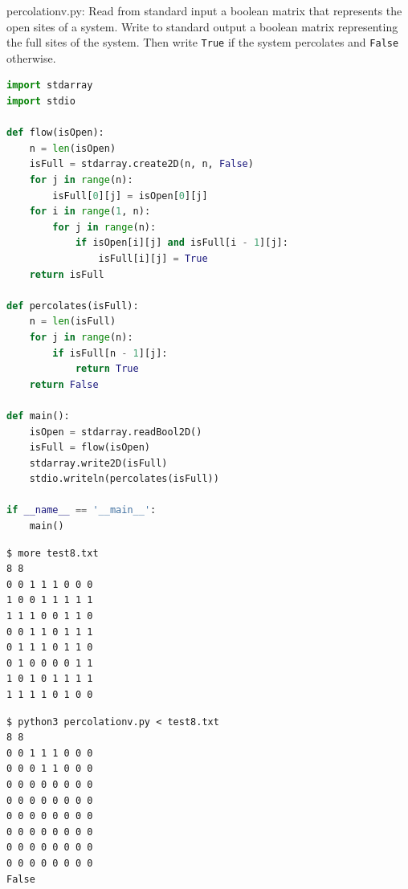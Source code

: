 \documentclass[8pt,a4paper,compress]{beamer}
\begin{document}
\begin{frame}[fragile]
\pause

\begin{framed}
\tiny percolationv.py: Read from standard input a boolean matrix that represents the open sites of a system. Write to standard output a boolean matrix representing the full sites of the system. Then write \lstinline{True} if the system percolates and \lstinline{False} otherwise.
\end{framed}

\begin{lstlisting}[language=Python]
import stdarray
import stdio

def flow(isOpen):
    n = len(isOpen)
    isFull = stdarray.create2D(n, n, False)
    for j in range(n):
        isFull[0][j] = isOpen[0][j]
    for i in range(1, n):
        for j in range(n):
            if isOpen[i][j] and isFull[i - 1][j]:
                isFull[i][j] = True
    return isFull

def percolates(isFull):
    n = len(isFull)
    for j in range(n):
        if isFull[n - 1][j]:
            return True
    return False

def main():
    isOpen = stdarray.readBool2D()
    isFull = flow(isOpen)
    stdarray.write2D(isFull)
    stdio.writeln(percolates(isFull))
    
if __name__ == '__main__':
    main()
\end{lstlisting}
\end{frame}

\begin{frame}[fragile]
\pause

\begin{lstlisting}[language={}]
$ more test8.txt 
8 8
0 0 1 1 1 0 0 0
1 0 0 1 1 1 1 1
1 1 1 0 0 1 1 0
0 0 1 1 0 1 1 1
0 1 1 1 0 1 1 0
0 1 0 0 0 0 1 1
1 0 1 0 1 1 1 1
1 1 1 1 0 1 0 0
\end{lstlisting}

\pause

\begin{lstlisting}[language={}]
$ python3 percolationv.py < test8.txt 
8 8
0 0 1 1 1 0 0 0 
0 0 0 1 1 0 0 0 
0 0 0 0 0 0 0 0 
0 0 0 0 0 0 0 0 
0 0 0 0 0 0 0 0 
0 0 0 0 0 0 0 0 
0 0 0 0 0 0 0 0 
0 0 0 0 0 0 0 0 
False
\end{lstlisting}
\end{frame}
\end{document}
